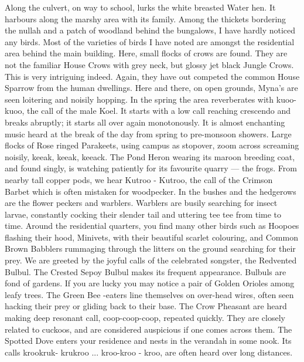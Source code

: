 Along the culvert, on way to school, lurks the white breasted 
Water hen. It harbours along the marshy area with its family. Among the 
thickets bordering the nullah and a patch of woodland behind the bungalows, 
I have hardly noticed any birds. Most of the varieties of birds I have noted 
are amongst the residential area behind the main building. Here, small 
flocks of crows are found. They are not the familiar House Crows with grey 
neck, but glossy jet black Jungle Crows. This is very intriguing indeed. 
Again, they have out competed the common House Sparrow from the human 
dwellings. Here and there, on open grounds, Myna's are seen loitering and 
noisily hopping. In the spring the area reverberates with kuoo-kuoo, the call 
of the male Koel. It starts with a low call reaching crescendo and breaks 
abruptly; it starts all over again monotonously. It is almost enchanting music 
heard at the break of the day from spring to pre-monsoon showers. Large 
flocks of Rose ringed Parakeets, using campus as stopover, zoom across 
screaming noisily, keeak, keeak, keeack. The Pond Heron wearing its 
maroon breeding coat, and found singly, is watching patiently for its 
favourite quarry --- the frogs. From nearby tall copper pods, we hear 
Kutroo - Kutroo, the call of the Crimson Barbet which is often mistaken for 
woodpecker. In the bushes and the hedgerows are the flower peckers and 
warblers. Warblers are busily searching for insect larvae, constantly cocking 
their slender tail and uttering tee tee from time to time. Around the 
residential quarters, you find many other birds such as Hoopoes flashing 
their hood, Minivets, with their beautiful scarlet colouring, and Common 
Brown Babblers rummaging through the litters on the ground searching for 
their prey. We are greeted by the joyful calls of the celebrated songster, the 
Redvented Bulbul. The Crested Sepoy Bulbul makes its frequent 
appearance. Bulbuls are fond of gardens. If you are lucky you may notice a 
pair of Golden Orioles among leafy trees. The Green Bee -eaters line 
themselves on over-head wires, often seen hacking their prey or gliding back 
to their base. The Crow Pheasant are heard making deep resonant call, 
coop-coop-coop, repeated quickly. They are closely related to cuckoos, and 
are considered auspicious if one comes across them. The Spotted Dove 
enters your residence and nests in the verandah in some nook. Its calls krookruk-
krukroo ... kroo-kroo - kroo, are often heard over long distances. 


